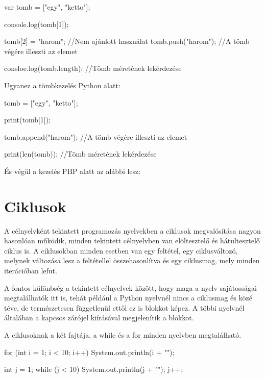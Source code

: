 \begin{cpp}
	var tomb = ["egy", "ketto"];
	
	console.log(tomb[1]);
	
	tomb[2] = "harom"; //Nem ajánlott használat
	tomb.push("harom"); //A tömb végére illeszti az elemet
	
	consloe.log(tomb.length); //Tömb méretének lekérdezése
\end{cpp}

Ugyanez a tömbkezelés Python alatt:

\begin{cpp}
	tomb = ["egy", "ketto"];
	
	print(tomb[1]);
	
	tomb.append("harom"); //A tömb végére illeszti az elemet
	
	print(len(tomb)); //Tömb méretének lekérdezése
\end{cpp}

És végül a kezelés PHP alatt az alábbi lesz:



\section{Ciklusok}

A célnyelvként tekintett programozás nyelvekben a ciklusok megvalósítása nagyon hasonlóan működik, minden tekintett célnyelvben van elöltesztelő és hátultesztelő ciklus is. A ciklusokban minden esetben van egy feltétel, egy ciklusváltozó, melynek változása lesz a feltétellel összehasonlítva és egy ciklusmag, mely minden iterációban lefut.

A fontos különbség a tekintett célnyelvek között, hogy maga a nyelv sajátosságai megtalálhatók itt is, tehát például a Python nyelvnél nincs a ciklusmag { és } közé téve, de természetesen függetlenül ettől ez is blokkot képez. A többi nyelvnél általában a kapcsos zárójel kiírásával megjelenítik a blokkot.

A ciklusoknak a két fajtája, a while és a for minden nyelvben megtalálható.

\begin{cpp}
	for (int i = 1; i < 10; i++) {
		System.out.println(i + "\n");
	}

	int j = 1;
	while (j < 10) {
		System.out.println(j + "\n");
		j++;
	}
\end{cpp}

